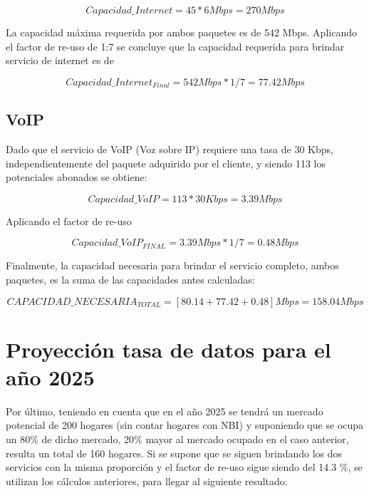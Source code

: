 \documentclass[12pt,a4paper]{book}
\begin{document}
\begin{equation}
Capacidad\_Internet = 45 * 6 Mbps = 270 Mbps
\end{equation}

La capacidad máxima requerida por ambos paquetes es de 542 Mbps. Aplicando el factor de re-uso de 1:7 se concluye que la capacidad requerida para brindar servicio de internet es de 

\begin{equation}
Capacidad\_Internet_{Final} = 542 Mbps * 1/7 = 77.42 Mbps
\end{equation}

\subsection{VoIP}

Dado que el servicio de VoIP (Voz sobre IP) requiere una tasa de 30 Kbps, independientemente del paquete adquirido por el cliente, y siendo 113 los potenciales abonados se obtiene:

\begin{equation}
Capacidad\_VoIP = 113 * 30 Kbps = 3.39 Mbps
\end{equation}

Aplicando el factor de re-uso

\begin{equation}
Capacidad\_VoIP_{FINAL} = 3.39 Mbps * 1/7 = 0.48 Mbps
\end{equation}

Finalmente, la capacidad necesaria para brindar el servicio completo, ambos paquetes, es la suma de las capacidades antes calculadas:

\begin{equation}
CAPACIDAD\_NECESARIA _{TOTAL} = [80.14 + 77.42 + 0.48] Mbps  = 158.04 Mbps
\end{equation}

\section{Proyección tasa de datos para el año 2025}

Por último, teniendo en cuenta que en el año 2025 se tendrá un mercado potencial de 200 hogares (sin contar hogares con NBI) y suponiendo que se ocupa un 80\% de dicho mercado, 20\% mayor al mercado ocupado en el caso anterior, resulta un total de 160 hogares. Si se supone que se siguen brindando los dos servicios con la misma proporción y el factor de re-uso sigue siendo del 14.3 \%, se utilizan los cálculos anteriores, para llegar al siguiente resultado:
\end{document}
